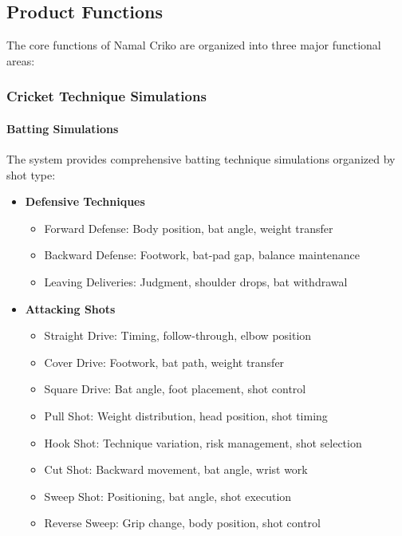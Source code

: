 \documentclass[12pt,a4paper]{article}
\begin{document}
\begin{enumerate}
\subsection{Product Functions}
The core functions of Namal Criko are organized into three major functional areas:

\subsubsection{Cricket Technique Simulations}
\paragraph{Batting Simulations}
The system provides comprehensive batting technique simulations organized by shot type:

\begin{itemize}
    \item \textbf{Defensive Techniques}
    \begin{itemize}
        \item Forward Defense: Body position, bat angle, weight transfer
        \item Backward Defense: Footwork, bat-pad gap, balance maintenance
        \item Leaving Deliveries: Judgment, shoulder drops, bat withdrawal
    \end{itemize}
    
    \item \textbf{Attacking Shots}
    \begin{itemize}
        \item Straight Drive: Timing, follow-through, elbow position
        \item Cover Drive: Footwork, bat path, weight transfer
        \item Square Drive: Bat angle, foot placement, shot control
        \item Pull Shot: Weight distribution, head position, shot timing
        \item Hook Shot: Technique variation, risk management, shot selection
        \item Cut Shot: Backward movement, bat angle, wrist work
        \item Sweep Shot: Positioning, bat angle, shot execution
        \item Reverse Sweep: Grip change, body position, shot control
    \end{itemize}
\end{itemize}


\end{enumerate}
\end{document}
